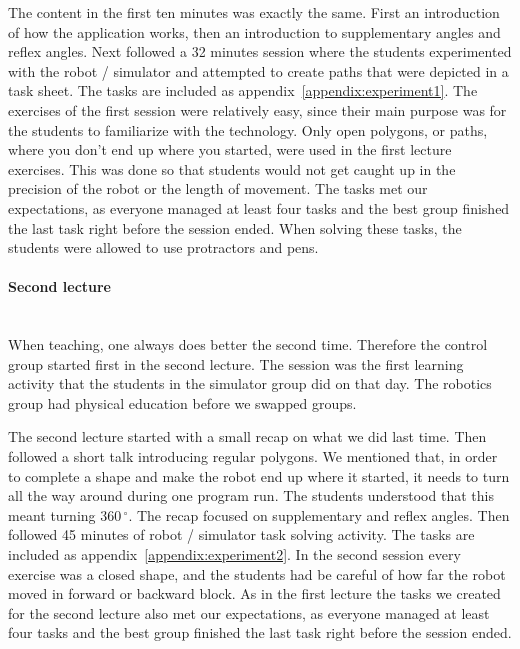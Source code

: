 \bigskip\noindent
The content in the first ten minutes was exactly the same. First an introduction of how the application works, then an introduction to supplementary angles and reflex angles. Next followed a 32 minutes session where the students experimented with the robot / simulator and attempted to create paths that were depicted in a task sheet. The tasks are included as appendix~\ref{appendix:experiment1}.
The exercises of the first session were relatively easy, since their main purpose was for the students to familiarize with the technology.
Only open polygons, or paths, where you don't end up where you started, were used in the first lecture exercises. This was done so that students would not get caught up in the precision of the robot or the length of movement.
The tasks met our expectations, as everyone managed at least four tasks and the best group finished the last task right before the session ended. When solving these tasks, the students were allowed to use protractors and pens. 


\paragraph{Second lecture}~\\
When teaching, one always does better the second time.
Therefore the control group started first in the second lecture.
The session was the first learning activity that the students in the simulator group did on that day. 
The robotics group had physical education before we swapped groups.

\bigskip\noindent
The second lecture started with a small recap on what we did last time. Then followed a short talk introducing regular polygons. We mentioned that, in order to complete a shape and make the robot end up where it started, it needs to turn all the way around during one program run. The students understood that this meant turning $360\,^{\circ}$. The recap focused on supplementary and reflex angles. Then followed 45 minutes of robot / simulator task solving activity. The tasks are included as appendix~\ref{appendix:experiment2}.
In the second session every exercise was a closed shape, and the students had be careful of how far the robot moved in forward or backward block. 
As in the first lecture the tasks we created for the second lecture also met our expectations, as everyone managed at least four tasks and the best group finished the last task right before the session ended.  